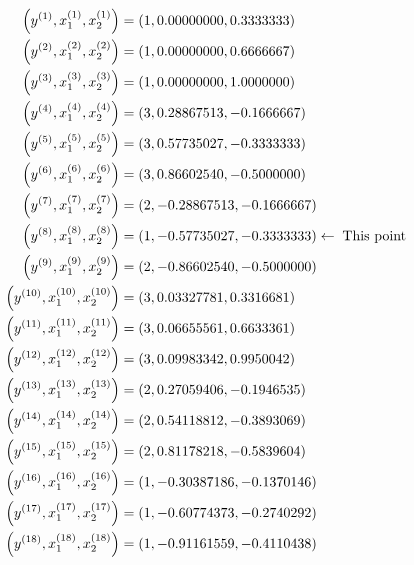 \documentclass{article}
\begin{document}
\begin{align*}
\left(y^{\left(1\right)}, x_{1}^{\left(1\right)}, x_{2}^{\left(1\right)}\right) &= \left(1,0.00000000,0.3333333\right)
\\ \left(y^{\left(2\right)}, x_{1}^{\left(2\right)}, x_{2}^{\left(2\right)}\right) &= \left(1,0.00000000,0.6666667\right)
\\ \left(y^{\left(3\right)}, x_{1}^{\left(3\right)}, x_{2}^{\left(3\right)}\right) &= \left(1,0.00000000,1.0000000\right)
\\ \left(y^{\left(4\right)}, x_{1}^{\left(4\right)}, x_{2}^{\left(4\right)}\right) &= \left(3,0.28867513,-0.1666667\right)
\\ \left(y^{\left(5\right)}, x_{1}^{\left(5\right)}, x_{2}^{\left(5\right)}\right) &= \left(3,0.57735027,-0.3333333\right)
\\ \left(y^{\left(6\right)}, x_{1}^{\left(6\right)}, x_{2}^{\left(6\right)}\right) &= \left(3,0.86602540,-0.5000000\right)
\\ \left(y^{\left(7\right)}, x_{1}^{\left(7\right)}, x_{2}^{\left(7\right)}\right) &= \left(2,-0.28867513,-0.1666667\right)
\\ \left(y^{\left(8\right)}, x_{1}^{\left(8\right)}, x_{2}^{\left(8\right)}\right) &= \left(1,-0.57735027,-0.3333333\right) \leftarrow \text{\;This point\;}
\\ \left(y^{\left(9\right)}, x_{1}^{\left(9\right)}, x_{2}^{\left(9\right)}\right) &= \left(2,-0.86602540,-0.5000000\right)
\\ \left(y^{\left(10\right)}, x_{1}^{\left(10\right)}, x_{2}^{\left(10\right)}\right) &= \left(3,0.03327781,0.3316681\right)
\\ \left(y^{\left(11\right)}, x_{1}^{\left(11\right)}, x_{2}^{\left(11\right)}\right) &= \left(3,0.06655561,0.6633361\right)
\\ \left(y^{\left(12\right)}, x_{1}^{\left(12\right)}, x_{2}^{\left(12\right)}\right) &= \left(3,0.09983342,0.9950042\right)
\\ \left(y^{\left(13\right)}, x_{1}^{\left(13\right)}, x_{2}^{\left(13\right)}\right) &= \left(2,0.27059406,-0.1946535\right)
\\ \left(y^{\left(14\right)}, x_{1}^{\left(14\right)}, x_{2}^{\left(14\right)}\right) &= \left(2,0.54118812,-0.3893069\right)
\\ \left(y^{\left(15\right)}, x_{1}^{\left(15\right)}, x_{2}^{\left(15\right)}\right) &= \left(2,0.81178218,-0.5839604\right)
\\ \left(y^{\left(16\right)}, x_{1}^{\left(16\right)}, x_{2}^{\left(16\right)}\right) &= \left(1,-0.30387186,-0.1370146\right)
\\ \left(y^{\left(17\right)}, x_{1}^{\left(17\right)}, x_{2}^{\left(17\right)}\right) &= \left(1,-0.60774373,-0.2740292\right)
\\ \left(y^{\left(18\right)}, x_{1}^{\left(18\right)}, x_{2}^{\left(18\right)}\right) &= \left(1,-0.91161559,-0.4110438\right)
\end{align*}
\end{document}
